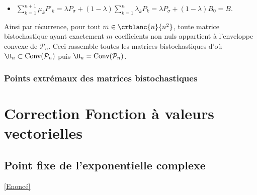 \documentclass{book}
\begin{document}
\begin{enumerate}[leftmargin=*]
\begin{itemize}
			\item $\displaystyle\sum_{k=1}^{n+1}\mu_kP'_k=\lambda P_\sigma+(1-\lambda)\sum_{k=1}^n\lambda_kP_k=\lambda P_\sigma +(1-\lambda)B_0=B$.
		\end{itemize}
		Ainsi par récurrence, pour tout $m\in \crblanc{n}{n^2}$, toute matrice bistochastique ayant exactement $m$ coefficients non nuls appartient à l'enveloppe convexe de $\mathcal P_n$. Ceci rassemble toutes les matrices bistochastiques d'où $\B_n\subset \text{Conv}(\mathcal P_n)$ puis $\B_n=\text{Conv}(\mathcal P_n)$.
	\end{enumerate}
	
	\subsubsection{Points extrémaux des matrices bistochastiques}
	
	\newpage
\section{Correction Fonction à valeurs vectorielles}
	\subsection{Point fixe de l'exponentielle complexe}
	\label{sec:point-fixe-de-lexponentielle-complexe}
	\textcolor{blue}{\hyperref[Point fixe de l'exponentielle complexe]{[Enoncé]}}\\
	
\end{document}
